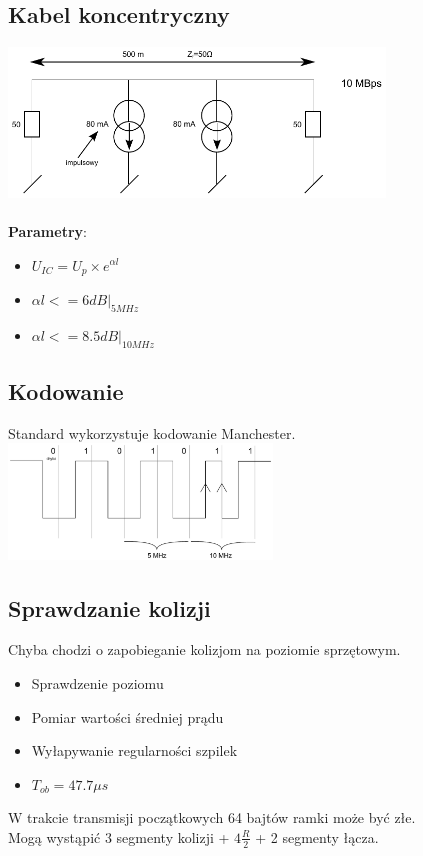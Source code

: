 		\subsection{Kabel koncentryczny}
			\includegraphics[width=10cm]{./images/image27.pdf}\\\\
			\textbf{Parametry}:
			\begin{itemize}
				\item $ U_{IC}=U_{p}\times e^{\alpha{l}} $
				\item $ \alpha{l} <= 6 dB|_{5 MHz} $
				\item $ \alpha{l} <= 8.5 dB|_{10 MHz} $
			\end{itemize}
		\subsection{Kodowanie}
			Standard wykorzystuje kodowanie Manchester.\\
			\includegraphics[width=7cm]{./images/image28.pdf}
		\subsection{Sprawdzanie kolizji}
			Chyba chodzi o zapobieganie kolizjom na poziomie sprzętowym.
			\begin{itemize}
				\item Sprawdzenie poziomu
				\item Pomiar wartości średniej prądu
				\item Wyłapywanie regularności szpilek
				\item $ T_{ob}=47.7 \mu{s} $
			\end{itemize}
			W trakcie transmisji początkowych 64 bajtów ramki może być złe.\\
			Mogą wystąpić 3 segmenty kolizji + $ 4 \frac{R}{2} $ + 2 segmenty łącza.

